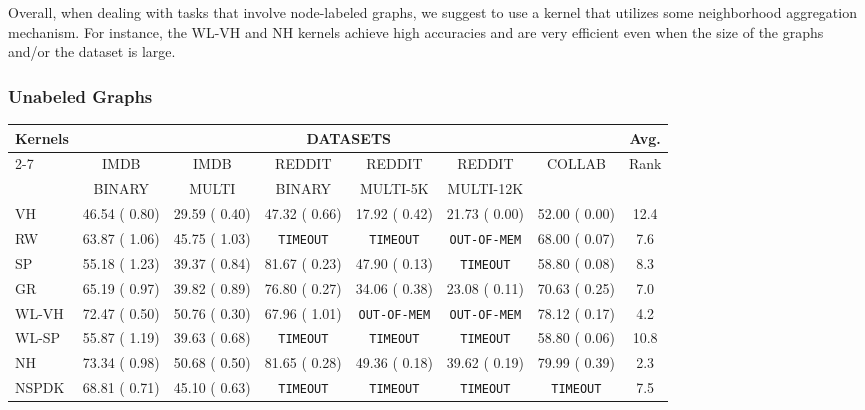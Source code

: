 \documentclass[twoside,11pt]{article}
\begin{document}
Overall, when dealing with tasks that involve node-labeled graphs, we suggest to use a kernel that utilizes some neighborhood aggregation mechanism.
For instance, the WL-VH and NH kernels achieve high accuracies and are very efficient even when the size of the graphs and/or the dataset is large.


\subsubsection{Unabeled Graphs}

\begin{table}[t]
\centering
\scriptsize
\begin{sc}
\def\arraystretch{1.1}
\resizebox{\textwidth}{!} {
\begin{tabular}{lccccccc} \hline
\multirow{3}{*}{Kernels} & \multicolumn{6}{c}{DATASETS} & \multirow{2}{*}{Avg.} \\ \cline{2-7}
& IMDB & IMDB & REDDIT & REDDIT & REDDIT & \multirow{2}{*}{COLLAB} & \multirow{2}{*}{Rank}\\
& BINARY & MULTI & BINARY & MULTI-5K & MULTI-12K & & \\ \hline
VH & 46.54 {\tiny ( 0.80)} & 29.59 {\tiny ( 0.40)} & 47.32 {\tiny ( 0.66)} & 17.92 {\tiny ( 0.42)} & 21.73 {\tiny ( 0.00)} & 52.00 {\tiny ( 0.00)} & 12.4\\ 
RW & 63.87 {\tiny ( 1.06)} & 45.75 {\tiny ( 1.03)} & \texttt{TIMEOUT} & \texttt{TIMEOUT} & \texttt{OUT-OF-MEM} & 68.00 {\tiny ( 0.07)} & 7.6 \\
SP & 55.18 {\tiny ( 1.23)} & 39.37 {\tiny ( 0.84)} & 81.67 {\tiny ( 0.23)} & 47.90 {\tiny ( 0.13)} & \texttt{TIMEOUT} & 58.80 {\tiny ( 0.08)} & 8.3 \\  
GR & 65.19 {\tiny ( 0.97)} & 39.82 {\tiny ( 0.89)} & 76.80 {\tiny ( 0.27)} & 34.06 {\tiny ( 0.38)} & 23.08 {\tiny ( 0.11)} & 70.63 {\tiny ( 0.25)} & 7.0 \\ 
WL-VH & 72.47 {\tiny ( 0.50)} & 50.76 {\tiny ( 0.30)} & 67.96 {\tiny ( 1.01)} & \texttt{OUT-OF-MEM} & \texttt{OUT-OF-MEM} & 78.12 {\tiny ( 0.17)} & 4.2 \\ 
WL-SP & 55.87 {\tiny ( 1.19)} & 39.63 {\tiny ( 0.68)} & \texttt{TIMEOUT} & \texttt{TIMEOUT} & \texttt{TIMEOUT} & 58.80 {\tiny ( 0.06)} & 10.8 \\
NH & 73.34 {\tiny ( 0.98)} & 50.68 {\tiny ( 0.50)} & 81.65 {\tiny ( 0.28)} & 49.36 {\tiny ( 0.18)} & 39.62 {\tiny ( 0.19)} & 79.99 {\tiny ( 0.39)} & 2.3 \\ 
NSPDK & 68.81 {\tiny ( 0.71)} & 45.10 {\tiny ( 0.63)} & \texttt{TIMEOUT} & \texttt{TIMEOUT} & \texttt{TIMEOUT} & \texttt{TIMEOUT} & 7.5 \\ 

\end{tabular}}
\end{sc}
\end{table}
\end{document}
